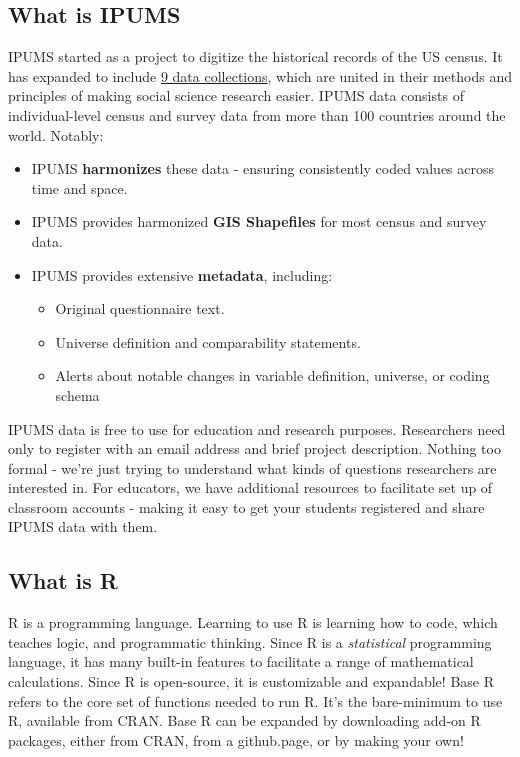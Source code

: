 \documentclass[
]{book}
\providecommand{\tightlist}{%
  \setlength{\itemsep}{0pt}\setlength{\parskip}{0pt}}
\begin{document}
\hypertarget{what-is-ipums}{%
\subsection*{What is IPUMS}\label{what-is-ipums}}

IPUMS started as a project to digitize the historical records of the US census.
It has expanded to include \href{https://www.ipums.org/}{9 data collections},
which are united in their methods and principles of making social science
research easier. IPUMS data consists of individual-level census and survey data
from more than 100 countries around the world. Notably:

\begin{itemize}
\tightlist
\item
  IPUMS \textbf{harmonizes} these data - ensuring consistently coded values across time and space.
\item
  IPUMS provides harmonized \textbf{GIS Shapefiles} for most census and survey data.
\item
  IPUMS provides extensive \textbf{metadata}, including:

  \begin{itemize}
  \tightlist
  \item
    Original questionnaire text.
  \item
    Universe definition and comparability statements.
  \item
    Alerts about notable changes in variable definition,
    universe, or coding schema
  \end{itemize}
\end{itemize}

IPUMS data is free to use for education and research purposes. Researchers need
only to register with an email address and brief project description. Nothing
too formal - we're just trying to understand what kinds of questions
researchers are interested in. For educators, we have additional resources
to facilitate set up of classroom accounts - making it easy to get your
students registered and share IPUMS data with them.

\hypertarget{what-is-r}{%
\subsection*{What is R}\label{what-is-r}}

R is a programming language. Learning to use R is learning how to code, which teaches logic, and programmatic thinking.
Since R is a \emph{statistical} programming language, it has many built-in features to facilitate a range of mathematical calculations.
Since R is open-source, it is customizable and expandable! Base R refers to the core set of functions needed to run R. It's the bare-minimum to use R, available from CRAN. Base R can be expanded by downloading add-on R packages, either from CRAN, from a github.page, or by making your own!
\end{document}
